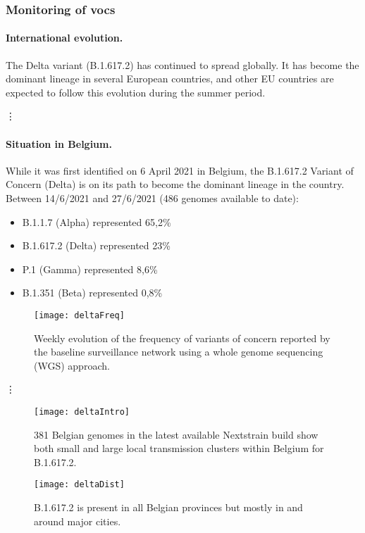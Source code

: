 \subsubsection{Monitoring of \gls{voc}s}
\paragraph*{International evolution.}
The Delta variant (B.1.617.2) has continued to spread globally.
It has become the dominant lineage in several European countries, and other EU countries are expected to follow this evolution during the summer period.

\vdots

\paragraph*{Situation in Belgium.}
While it was first identified on 6 April 2021 in Belgium, the B.1.617.2 Variant of Concern (Delta) is on its path to become the dominant lineage in the country.
Between 14/6/2021 and 27/6/2021 (486 genomes available to date):
\begin{itemize}
  \item B.1.1.7 (Alpha) represented 65,2\%
  \item B.1.617.2 (Delta) represented 23\%
  \item P.1 (Gamma) represented 8,6\%
  \item B.1.351 (Beta) represented 0,8\%
\end{itemize}

\begin{figure}[ht]
  \centering
  \texttt{[image: deltaFreq]}
  \caption[Weekly VOCs as of 2021-06-21]{Weekly evolution of the frequency of variants of concern reported by the baseline surveillance network using a whole genome sequencing (WGS) approach.}
  \label{fig:deltaFreq}
\end{figure}

\vdots

\begin{figure}[ht]
  \centering
  \texttt{[image: deltaIntro]}
  \caption[Introductions and local transmission of B.1.617.2]{381 Belgian genomes in the latest available Nextstrain build show both small and large local transmission clusters within Belgium for B.1.617.2.}
  \label{fig:deltaIntro}
\end{figure}

\begin{figure}[!ht]
  \centering
  \texttt{[image: deltaDist]}
  \caption[Distribution of Belgian B.1.617.2 sequences]{B.1.617.2 is present in all Belgian provinces but mostly in and around major cities.}
  \label{fig:deltaDist}
\end{figure}

